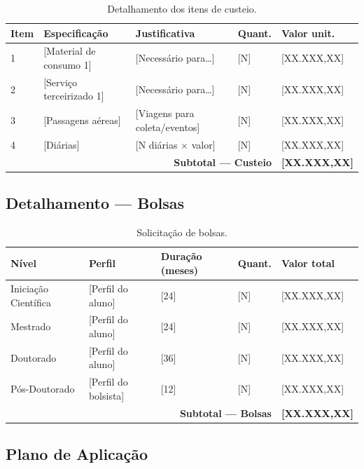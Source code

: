 \documentclass[
  12pt,
  a4paper,
  oneside,
  english,      %
  brazil
]{article}
\begin{document}
\begin{table}[H]
  \centering
  \caption{Detalhamento dos itens de custeio.}
  \label{tab:orcamento-custeio}
  \begin{tabularx}{\textwidth}{p{1.5cm}Xp{2cm}p{1.8cm}p{1.8cm}}
    \toprule
    \textbf{Item} & \textbf{Especificação} & \textbf{Justificativa} &
    \textbf{Quant.} & \textbf{Valor unit.} \\
    \midrule
    1 & [Material de consumo 1] & [Necessário para…] & [N] & [XX.XXX,XX] \\
    2 & [Serviço terceirizado 1] & [Necessário para…] & [N] & [XX.XXX,XX] \\
    3 & [Passagens aéreas] & [Viagens para coleta/eventos] & [N] & [XX.XXX,XX] \\
    4 & [Diárias] & [N diárias × valor] & [N] & [XX.XXX,XX] \\
    \midrule
    \multicolumn{4}{r}{\textbf{Subtotal — Custeio}} & \textbf{[XX.XXX,XX]} \\
    \bottomrule
  \end{tabularx}
\end{table}

\subsection{Detalhamento — Bolsas}

\begin{table}[H]
  \centering
  \caption{Solicitação de bolsas.}
  \label{tab:orcamento-bolsas}
  \begin{tabularx}{\textwidth}{lXp{2cm}p{1.8cm}p{1.8cm}}
    \toprule
    \textbf{Nível} & \textbf{Perfil} & \textbf{Duração (meses)} &
    \textbf{Quant.} & \textbf{Valor total} \\
    \midrule
    Iniciação Científica & [Perfil do aluno] & [24] & [N] & [XX.XXX,XX] \\
    Mestrado   & [Perfil do aluno] & [24] & [N] & [XX.XXX,XX] \\
    Doutorado  & [Perfil do aluno] & [36] & [N] & [XX.XXX,XX] \\
    Pós-Doutorado & [Perfil do bolsista] & [12] & [N] & [XX.XXX,XX] \\
    \midrule
    \multicolumn{4}{r}{\textbf{Subtotal — Bolsas}} & \textbf{[XX.XXX,XX]} \\
    \bottomrule
  \end{tabularx}
\end{table}

\subsection{Plano de Aplicação}
\end{document}
